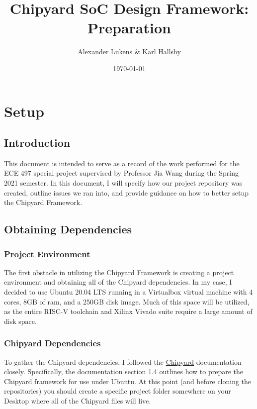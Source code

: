 \documentclass[oneside]{book}
\begin{document}
	\begin{titlepage}
		\vspace{1in}
		\title{Chipyard SoC Design Framework: Preparation}
		\author{Alexander Lukens \& Karl Hallsby}
		\date{\today}
	\end{titlepage}
	\maketitle
	\frontmatter
	\tableofcontents

	\mainmatter
	\chapter{Setup}
	\section{Introduction}
	This document is intended to serve as a record of the work performed for the ECE 497 special project supervised by Professor Jia Wang during the Spring 2021 semester. In this document, I will specify how our project repository was created, outline issues we ran into, and provide guidance on how to better setup the Chipyard Framework.
	\section{Obtaining Dependencies}
	\subsection{Project Environment}
	The first obstacle in utilizing the Chipyard Framework is creating a project environment and obtaining all of the Chipyard dependencies.	In my case, I decided to use Ubuntu 20.04 LTS running in a Virtualbox virtual machine with 4 cores, 8GB of ram, and a 250GB disk image. Much of this space will be utilized, as the entire RISC-V toolchain and Xilinx Vivado suite require a large amount of disk space.
	
	\subsection{Chipyard Dependencies}
	To gather the Chipyard dependencies, I followed the \hyperref{https://chipyard.readthedocs.io/en/latest/}{}{}{Chipyard} documentation closely. Specifically, the documentation section 1.4 outlines how to prepare the Chipyard framework for use under Ubuntu. At this point (and before cloning the repositories) you should create a specific project folder somewhere on your Desktop where all of the Chipyard files will live.
	
\end{document}
